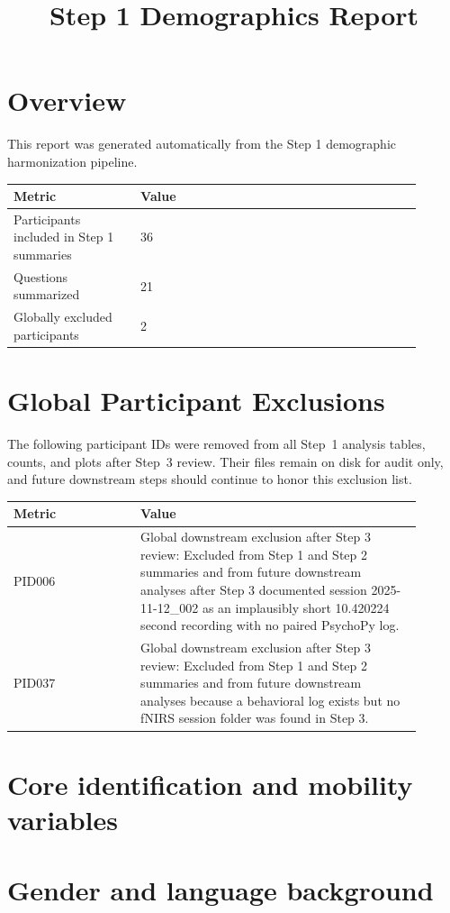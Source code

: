 \documentclass[11pt]{article}
\title{Step 1 Demographics Report}
\date{}
\begin{document}
\maketitle
\section*{Overview}
This report was generated automatically from the Step 1 demographic harmonization pipeline.
\begin{tabular}{p{0.28\linewidth}p{0.62\linewidth}}
\toprule
Metric & Value\\
\midrule
Participants included in Step 1 summaries & 36\\
Questions summarized & 21\\
Globally excluded participants & 2\\
\bottomrule
\end{tabular}
\section*{Global Participant Exclusions}
The following participant IDs were removed from all Step~1 analysis tables, counts, and plots after Step~3 review. Their files remain on disk for audit only, and future downstream steps should continue to honor this exclusion list.
\begin{tabular}{p{0.28\linewidth}p{0.62\linewidth}}
\toprule
Metric & Value\\
\midrule
PID006 & Global downstream exclusion after Step 3 review: Excluded from Step 1 and Step 2 summaries and from future downstream analyses after Step 3 documented session 2025-11-12\_002 as an implausibly short 10.420224 second recording with no paired PsychoPy log.\\
PID037 & Global downstream exclusion after Step 3 review: Excluded from Step 1 and Step 2 summaries and from future downstream analyses because a behavioral log exists but no fNIRS session folder was found in Step 3.\\
\bottomrule
\end{tabular}
\section*{Core identification and mobility variables}




\section*{Gender and language background}




\end{document}
